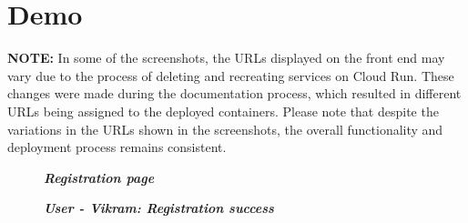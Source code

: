 \section{Demo}
\textbf{NOTE:}
In some of the screenshots, the URLs displayed on the front end may vary due to the process of deleting and recreating services on Cloud Run. These changes were made during the documentation process, which resulted in different URLs being assigned to the deployed containers. Please note that despite the variations in the URLs shown in the screenshots, the overall functionality and deployment process remains consistent.
\begin{figure}[htp]
    \centering
    \caption{\textbf{\textit{ Registration page }}}
    \label{fig:reg-page}
\end{figure}

\begin{figure}[htp]
    \centering
    \caption{\textbf{\textit{ User - Vikram: Registration success }}}
    \label{fig:vikram-reg-success}
\end{figure}

